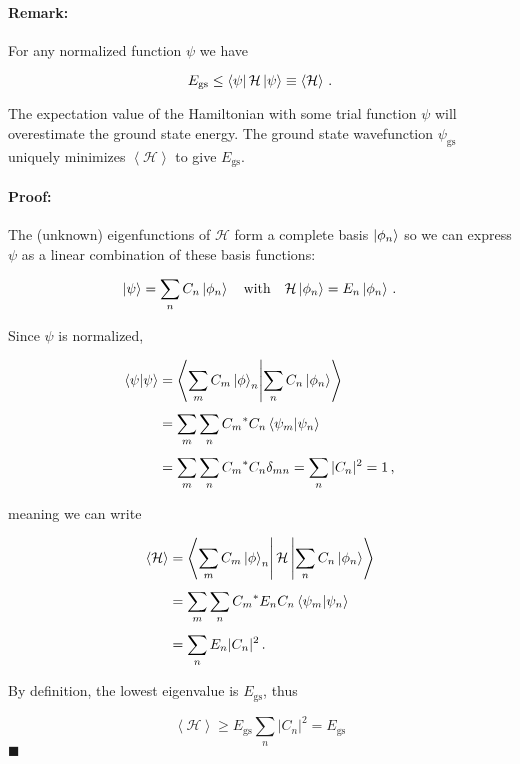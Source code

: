 \documentclass[12pt, titlepage]{article}
\newcommand{\exv}[1]{\left\langle #1 \right\rangle}
\begin{document}
\begin{mdframed}
\paragraph*{Remark:}
For any normalized function $\psi$ we have

\begin{equation}
	E_\text{gs} \leq \bra{\psi}\mathcal{H}\ket{\psi} \equiv \exv{\mathcal{H}} \,.
\end{equation}

The expectation value of the Hamiltonian with some trial function $\psi$ will overestimate the ground state energy. The ground state wavefunction $\psi_\text{gs}$ uniquely minimizes $\exv{\mathcal{H}}$ to give $E_\text{gs}$.

\paragraph{Proof:}
The (unknown) eigenfunctions of $\mathcal{H}$ form a complete basis $\ket{\phi_n}$ so we can express $\psi$ as a linear combination of these basis functions:

\begin{equation*}
	\ket{\psi} = \sum_n C_n\ket{\phi_n} \quad\text{with}\quad\mathcal{H}\ket{\phi_n} = E_n\ket{\phi_n}\,.
\end{equation*}

Since $\psi$ is normalized, 

\begin{align*}
	\bra{\psi}\ket{\psi} &= \bra{\sum_mC_m\ket\phi_n}\ket{\sum_n C_n\ket{\phi_n}} \\[4pt]
	&= \sum_m\sum_n {C_m}^*C_n\bra{\psi_m}\ket{\psi_n} \\[4pt]
	&= \sum_m\sum_n {C_m}^*C_n \delta_{mn} = \sum_n |C_n|^2 = 1 \,,
\end{align*}

meaning we can write

\begin{align*}
	\exv{\mathcal{H}} &= \bra{\sum_mC_m\ket\phi_n}\mathcal{H}\ket{\sum_n C_n\ket{\phi_n}} \\[4pt]
	&= \sum_m\sum_n {C_m}^*E_n C_n\bra{\psi_m}\ket{\psi_n} \\[4pt]
	&= \sum_n E_n|C_n|^2 \,.
\end{align*}

By definition, the lowest eigenvalue is $E_\text{gs}$, thus

\begin{equation*}
	\exv{\mathcal{H}} \geq E_\text{gs}\sum_n|C_n|^2 = E_\text{gs}
\end{equation*}
\hspace*{\fill}$\blacksquare$
\end{mdframed}
\end{document}
